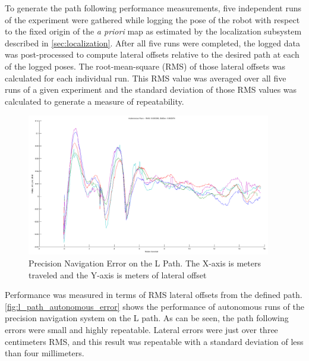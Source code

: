 To generate the path following performance measurements, five independent runs of the experiment were gathered while logging the pose of the robot with respect to the fixed origin of the \emph{a priori} map as estimated by the localization subsystem described in \autoref{sec:localization}. After all five runs were completed, the logged data was post-processed to compute lateral offsets relative to the desired path at each of the logged poses. The root-mean-square (RMS) of those lateral offsets was calculated for each individual run. This RMS value was averaged over all five runs of a given experiment and the standard deviation of those RMS values was calculated to generate a measure of repeatability.

\begin{figure}
\centering
\includegraphics[width=0.95\textwidth]{images/l_path_autonomous_error}
\caption[Precision Navigation Error on the L Path]{Precision Navigation Error on the L Path. The X-axis is meters traveled and the Y-axis is meters of lateral offset}
\label{fig:l_path_autonomous_error}
\end{figure}

Performance was measured in terms of RMS lateral offsets from the defined path. \autoref{fig:l_path_autonomous_error} shows the performance of autonomous runs of the precision navigation system on the L path. As can be seen, the path following errors were small and highly repeatable. Lateral errors were just over three centimeters RMS, and this result was repeatable with a standard deviation of less than four millimeters.

